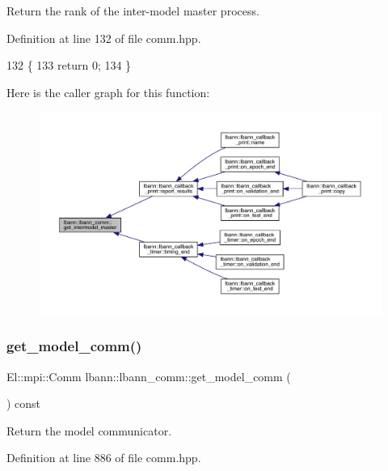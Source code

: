 Return the rank of the inter-\/model master process. 

Definition at line 132 of file comm.\+hpp.


\begin{DoxyCode}
132                                            \{
133     \textcolor{keywordflow}{return} 0;
134   \}
\end{DoxyCode}
Here is the caller graph for this function\+:\nopagebreak
\begin{figure}[H]
\begin{center}
\leavevmode
\includegraphics[width=350pt]{classlbann_1_1lbann__comm_adbd99fe6c8df2689217c9ee16d6234d7_icgraph}
\end{center}
\end{figure}
\mbox{\label{classlbann_1_1lbann__comm_acc06dd4de92e45030d6fbe5984ae58d1}} 
\subsubsection{\texorpdfstring{get\+\_\+model\+\_\+comm()}{get\_model\_comm()}}
{\footnotesize\ttfamily El\+::mpi\+::\+Comm lbann\+::lbann\+\_\+comm\+::get\+\_\+model\+\_\+comm (\begin{DoxyParamCaption}{ }\end{DoxyParamCaption}) const\hspace{0.3cm}{\ttfamily [inline]}}

Return the model communicator. 

Definition at line 886 of file comm.\+hpp.


